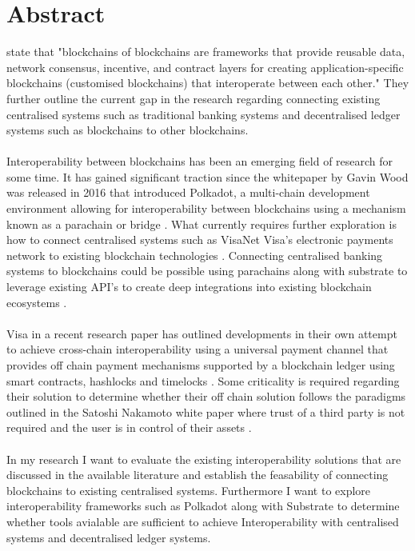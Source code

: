 \documentclass[12pt]{article}
\begin{document}
\section{Abstract}
\autocite{belchiorSurveyBlockchainInteroperability2021}
state that "blockchains of blockchains are frameworks that provide reusable data, network consensus, incentive,
and contract layers for creating application-specific blockchains (customised blockchains) that interoperate between each other."
They further outline the current gap in the research regarding connecting existing centralised systems such as traditional banking
systems and decentralised ledger systems such as blockchains to other blockchains.
\\\\
Interoperability between blockchains has been an emerging field of
research for some time. It has gained significant traction since the whitepaper by Gavin Wood was released in 2016 that introduced Polkadot,
a multi-chain development environment allowing for interoperability between blockchains using a mechanism known as a parachain or bridge \autocite{woodPOLKADOTVISIONHETEROGENEOUS2016}.
What currently requires further exploration is how to connect centralised systems such as VisaNet Visa's electronic payments network to existing blockchain technologies \autocite{VisaNetTechnologyVisa}.
Connecting centralised banking systems to blockchains could be possible using parachains along with substrate to leverage existing API's to create deep integrations into existing blockchain ecosystems \autocite{polkadotPolkadotDecoded20202021}.
\\\\
Visa in a recent research paper has outlined developments in their own attempt to achieve cross-chain interoperability using a universal payment channel that provides off chain payment mechanisms
supported by a blockchain ledger using smart contracts, hashlocks and timelocks \autocite{christodorescuUniversalPaymentChannels2021}. Some criticality is required regarding their solution to determine whether their off chain solution follows the paradigms
outlined in the Satoshi Nakamoto white paper where trust of a third party is not required and the user is in control of their assets \autocite{nakamotoBitcoinPeertoPeerElectronic}.
\\\\
In my research I want to evaluate the existing interoperability solutions that are discussed in the available literature and establish the feasability of connecting blockchains to existing centralised systems.
Furthermore I want to explore interoperability frameworks such as Polkadot along with Substrate to determine whether tools avialable are sufficient to achieve Interoperability with centralised systems and decentralised ledger systems.
\end{document}
